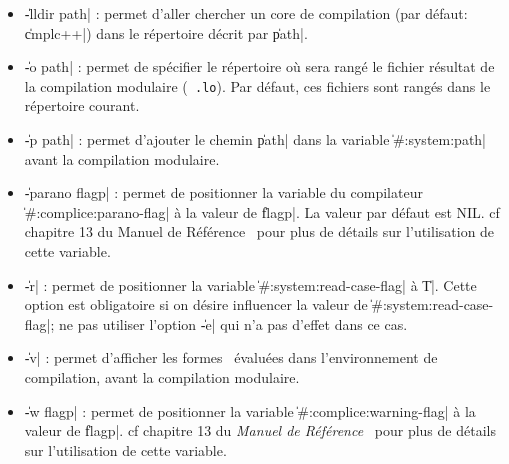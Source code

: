 \begin{itemize}
\item {\Large \|-lldir path|} : permet d'aller chercher un core de
compilation (par d\'{e}faut: \|cmplc++|) dans le r\'{e}pertoire d\'{e}crit par
\|path|. 

\item {\Large \|-o path|} : permet de sp\'{e}cifier le r\'{e}pertoire o\`{u}
sera rang\'{e} le fichier r\'{e}sultat de la compilation modulaire ({\tt
.lo}). Par d\'{e}faut, ces fichiers sont rang\'{e}s dans le r\'{e}pertoire
courant. 

\item {\Large \|-p path|} : permet d'ajouter le chemin \|path| dans la
variable \|#:system:path| avant la compilation modulaire. 

\item {\Large \|-parano flagp|} : permet de positionner la variable du
compilateur \|#:complice:parano-flag| \`{a} la valeur de \|flagp|. La
valeur par d\'{e}faut est NIL. cf chapitre 13 du Manuel de R\'{e}f\'{e}rence
\LeLisp\ pour plus de d\'{e}tails sur l'utilisation de cette variable.

\item {\Large \|-r|} : permet de positionner la variable 
\|#:system:read-case-flag| \`{a} \|T|. Cette option est
obligatoire si on d\'{e}sire influencer la valeur de 
\|#:system:read-case-flag|; ne pas utiliser l'option \|-e| qui n'a pas
d'effet dans ce cas.

\item {\Large \|-v|} : permet d'afficher les formes \LeLisp\
\'{e}valu\'{e}es dans l'environnement de compilation, avant la compilation
modulaire.

\item {\Large \|-w flagp|} : permet de positionner la variable 
\|#:complice:warning-flag| \`{a} la valeur de \|flagp|. cf chapitre 13 du
{\em Manuel de R\'{e}f\'{e}rence} \LeLisp\ pour plus de d\'{e}tails sur l'utilisation
de cette variable.
\end{itemize}
